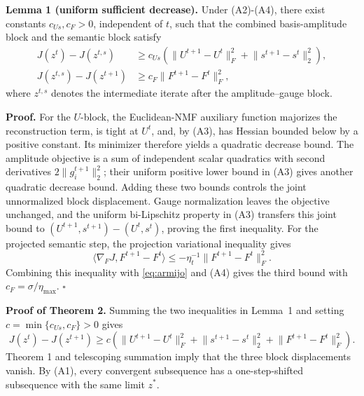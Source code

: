 \documentclass[a4paper,preprint,12pt]{elsarticle}
\theoremstyle{remark}
\begin{document}
\textbf{Lemma 1 (uniform sufficient decrease).}
Under (A2)-(A4), there exist constants \(c_{Us},c_F>0\), independent of \(t\), such that the combined basis-amplitude block and the semantic block satisfy
\[
\begin{aligned}
J(z^t)-J(z^{t,s})&\ge c_{Us}\!\left(
\lVert U^{t+1}-U^t\rVert_F^2+
\lVert s^{t+1}-s^t\rVert_2^2\right),\\
J(z^{t,s})-J(z^{t+1})&\ge c_F\lVert F^{t+1}-F^t\rVert_F^2,
\end{aligned}
\]
where \(z^{t,s}\) denotes the intermediate iterate after the amplitude--gauge block.

\textbf{Proof.}
For the \(U\)-block, the Euclidean-NMF auxiliary function majorizes the reconstruction term, is tight at \(U^t\), and, by (A3), has Hessian bounded below by a positive constant. Its minimizer therefore yields a quadratic decrease bound. The amplitude objective is a sum of independent scalar quadratics with second derivatives \(2\lVert g_i^{t+1}\rVert_2^2\); their uniform positive lower bound in (A3) gives another quadratic decrease bound. Adding these two bounds controls the joint unnormalized block displacement. Gauge normalization leaves the objective unchanged, and the uniform bi-Lipschitz property in (A3) transfers this joint bound to \((U^{t+1},s^{t+1})-(U^t,s^t)\), proving the first inequality. For the projected semantic step, the projection variational inequality gives
\[
\langle\nabla_FJ,F^{t+1}-F^t\rangle
\le-\eta_t^{-1}\lVert F^{t+1}-F^t\rVert_F^2.
\]
Combining this inequality with \eqref{eq:armijo} and (A4) gives the third bound with \(c_F=\sigma/\eta_{\max}\). \(\square\)

\textbf{Proof of Theorem 2.}
Summing the two inequalities in Lemma~1 and setting \(c=\min\{c_{Us},c_F\}>0\) gives
\[
J(z^t)-J(z^{t+1})\ge c\!\left(
\lVert U^{t+1}-U^t\rVert_F^2+
\lVert s^{t+1}-s^t\rVert_2^2+
\lVert F^{t+1}-F^t\rVert_F^2\right).
\]
Theorem 1 and telescoping summation imply that the three block displacements vanish. By (A1), every convergent subsequence has a one-step-shifted subsequence with the same limit \(z^*\).
\end{document}
